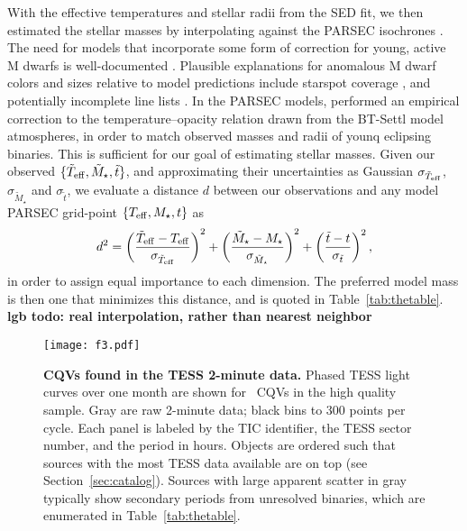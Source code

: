 \documentclass[11pt,twocolumn,tighten]{aastex63}
\begin{document}
With the effective temperatures and stellar radii from the SED fit, we
then estimated the stellar masses by interpolating against the PARSEC
isochrones \citep[v1.2S][]{2014MNRAS.444.2525C}.  The need for models
that incorporate some form of correction for young, active M dwarfs is
well-documented
\citep[e.g.][]{2012ApJ...756...47S,2015ApJ...804..146D,2016A&A...593A..99F,2020ApJ...891...29S}.
Plausible explanations for anomalous M dwarf colors and sizes relative
to model predictions include starspot coverage
\citep[e.g.][]{2017ApJ...836..200G}, and potentially incomplete line
lists \citep[e.g.][]{2013A&A...556A..15R}.  In the PARSEC models,
\citet{2014MNRAS.444.2525C} performed an empirical correction to the
temperature--opacity relation drawn from the BT-Settl model
atmospheres, in order to match observed masses and radii of younq
eclipsing binaries.  This is sufficient for our goal of estimating
stellar masses.  Given our observed $\{ \tilde{T}_{\rm eff},
\tilde{M}_\star, \tilde{t} \}$, and approximating their uncertainties
as Gaussian $\sigma_{\tilde{T}_{\rm eff}}$, $\sigma_{\tilde{M}_\star}$
and $\sigma_{\tilde{t}}$, we evaluate a distance $d$ between our
observations and any model PARSEC grid-point $\{ T_{\rm eff}, M_\star,
t \}$ as
\begin{equation}
  d^2 = 
  \left( \frac{\tilde{T}_{\rm eff} - T_{\rm eff}}{\sigma_{\tilde{T}_{\rm eff}}} \right)^2
  +
  \left( \frac{\tilde{M}_{\star} - M_{\star}}{\sigma_{\tilde{M}_{\star}}} \right)^2
  +
  \left( \frac{\tilde{t} - t}{\sigma_{\tilde{t}}} \right)^2,
\end{equation}
in order to assign equal importance to each dimension.  The preferred
model mass is then one that minimizes this distance, and is quoted in
Table~\ref{tab:thetable}.
{\bf lgb todo: real interpolation, rather than nearest neighbor}



\begin{figure*}[!tp]
	\begin{center}
		\centering
		\texttt{[image: f3.pdf]}
    \vspace{-0.3cm}
		\caption{
      {\bf CQVs found in the TESS 2-minute data.}
      Phased TESS light curves over one month are shown for \ngoods\
      CQVs in the high quality sample.  Gray are raw 2-minute data;
      black bins to 300 points per cycle.  Each panel is labeled by
      the TIC identifier, the TESS sector number, and the period in
      hours.  Objects are ordered such that sources with the most TESS
      data available are on top (see Section~\ref{sec:catalog}).
      Sources with large apparent scatter in gray typically show
      secondary periods from unresolved binaries, which are enumerated
      in Table~\ref{tab:thetable}.
		}
		\label{fig:cqvs}
	\end{center}
\end{figure*}
\end{document}
